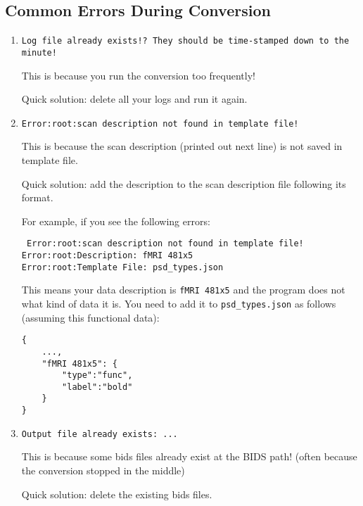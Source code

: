 \documentclass[12pt]{myland}
\def\<#1>{\texttt{#1}}
\begin{document}
    \subsection{Common Errors During Conversion}
    \begin{enumerate}[itemsep=5pt]
        \item \<Log file already exists!?  They should be time-stamped down to the minute!> \par
            This is because you run the conversion too frequently! \par
            \color{red}Quick solution: \color{black}delete all your logs and run it again.

        \item \<Error:root:scan description not found in template file!> \par
            This is because the scan description (printed out next line) is not saved in template file. \par
            \color{red}Quick solution: \color{black}add the description to the scan description file following
            its format. \par
            For example, if you see the following errors:  \par
            \begin{mybox}
            \centering 
            \<
            Error:root:scan description not found in template file! \\
            Error:root:Description: fMRI 481x5 \\
            Error:root:Template File: psd\_types.json>
            \end{mybox}
            This means your data description is \<fMRI 481x5> and the program does not what kind of data it is.
            You need to add it to \<psd\_types.json> as follows (assuming this functional data):
            \begin{lstlisting}
{
    ...,
    "fMRI 481x5": {
        "type":"func",
        "label":"bold"
    }
}
            \end{lstlisting}
        \item \<Output file already exists: ...> \par
            This is because some bids files already exist at the BIDS path! (often because the conversion stopped in
            the middle) \par
            \color{red}Quick solution: \color{black}delete the existing bids files.
    \end{enumerate}
\end{document}
